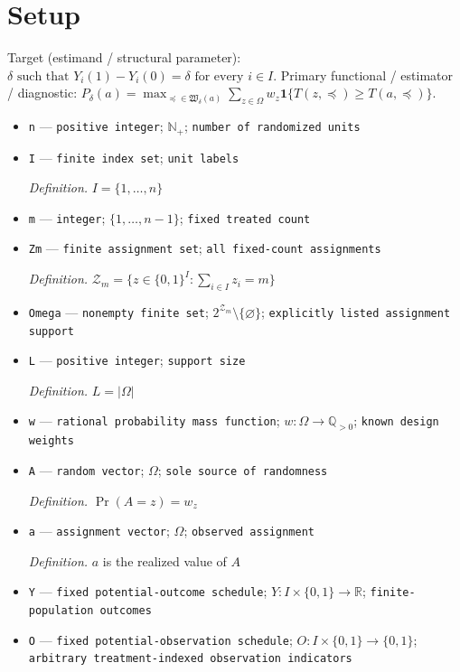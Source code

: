 \documentclass{article}
\begin{document}
\section{Setup}

Target (estimand / structural parameter): \(\delta\text{ such that }Y_i(1)-Y_i(0)=\delta\text{ for every }i\in I\).
Primary functional / estimator / diagnostic: \(P_\delta(a)=\max_{\preceq\in\mathfrak W_\delta(a)}\sum_{z\in\Omega}w_z\mathbf 1\{T(z,\preceq)\ge T(a,\preceq)\}\).
\begin{itemize}
  \item \texttt{n} --- \texttt{positive integer}; \(\mathbb N_{+}\); \texttt{number of randomized units}
  \item \texttt{I} --- \texttt{finite index set}; \texttt{unit labels}
  \par\smallskip\noindent\emph{Definition.} \(I=\{1,\ldots,n\}\)
  \item \texttt{m} --- \texttt{integer}; \(\{1,\ldots,n-1\}\); \texttt{fixed treated count}
  \item \texttt{Zm} --- \texttt{finite assignment set}; \texttt{all fixed-\allowbreak{}count assignments}
  \par\smallskip\noindent\emph{Definition.} \(\mathcal Z_m=\{z\in\{0,1\}^{I}:\sum_{i\in I}z_i=m\}\)
  \item \texttt{Omega} --- \texttt{nonempty finite set}; \(2^{\mathcal Z_m}\setminus\{\varnothing\}\); \texttt{explicitly listed assignment support}
  \item \texttt{L} --- \texttt{positive integer}; \texttt{support size}
  \par\smallskip\noindent\emph{Definition.} \(L=|\Omega|\)
  \item \texttt{w} --- \texttt{rational probability mass function}; \(w:\Omega\to\mathbb Q_{>0}\); \texttt{known design weights}
  \item \texttt{A} --- \texttt{random vector}; \(\Omega\); \texttt{sole source of randomness}
  \par\smallskip\noindent\emph{Definition.} \(\Pr(A=z)=w_z\)
  \item \texttt{a} --- \texttt{assignment vector}; \(\Omega\); \texttt{observed assignment}
  \par\smallskip\noindent\emph{Definition.} \(a\) is the realized value of \(A\)
  \item \texttt{Y} --- \texttt{fixed potential-\allowbreak{}outcome schedule}; \(Y:I\times\{0,1\}\to\mathbb R\); \texttt{finite-\allowbreak{}population outcomes}
  \item \texttt{O} --- \texttt{fixed potential-\allowbreak{}observation schedule}; \(O:I\times\{0,1\}\to\{0,1\}\); \texttt{arbitrary treatment-\allowbreak{}indexed observation indicators}

\end{itemize}
\end{document}
